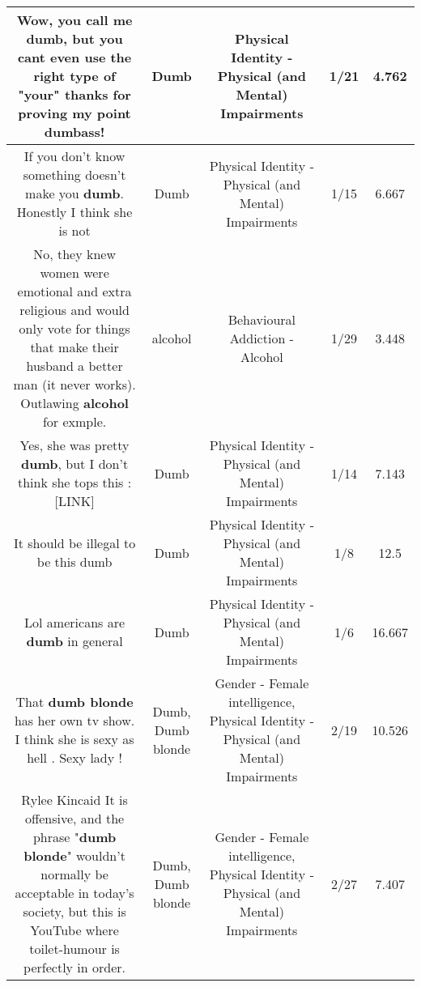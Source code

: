 \documentclass[11pt]{article}
\newlength\mylength
\begin{document}
\begin{center}
\begin{longtable}{|C{.65\mylength}|C{.30\mylength}|C{.12\mylength}|C{.12\mylength}|C{.12\mylength}|}
  \small Wow, you call me \textbf{dumb}, but you cant even use the right type of "your" thanks for proving my point dumbass!\normalsize   & Dumb & Physical Identity - Physical (and Mental) Impairments & 1/21 & 4.762 \\  \hline
  \small If you don't know something doesn't make you \textbf{dumb}. Honestly I think she is not\normalsize   & Dumb & Physical Identity - Physical (and Mental) Impairments & 1/15 & 6.667 \\  \hline
  \small No, they knew women were emotional and extra religious and would only vote for things that make their husband a better man (it never works). Outlawing \textbf{alcohol} for exmple.\normalsize   & alcohol & Behavioural Addiction - Alcohol & 1/29 & 3.448 \\  \hline
  \small Yes, she was pretty \textbf{dumb}, but I don't think she tops this :  [LINK] \normalsize   & Dumb & Physical Identity - Physical (and Mental) Impairments & 1/14 & 7.143 \\  \hline
  \small It should be illegal to be this dumb\normalsize   & Dumb & Physical Identity - Physical (and Mental) Impairments & 1/8 & 12.5 \\  \hline
  \small Lol americans are \textbf{dumb} in general\normalsize   & Dumb & Physical Identity - Physical (and Mental) Impairments & 1/6 & 16.667 \\  \hline
  \small That \textbf{d\textbf{umb} blonde} has her own tv show. I think she is sexy as hell . Sexy lady !\normalsize   & Dumb, Dumb blonde & Gender - Female intelligence, Physical Identity - Physical (and Mental) Impairments & 2/19 & 10.526 \\  \hline
  \small Rylee Kincaid  It is offensive, and the phrase "\textbf{d\textbf{umb} blonde}" wouldn't normally be acceptable in today's society, but this is YouTube where toilet-humour is perfectly in order.\normalsize   & Dumb, Dumb blonde & Gender - Female intelligence, Physical Identity - Physical (and Mental) Impairments & 2/27 & 7.407 \\  \hline

\end{longtable}
\end{center}
\end{document}

